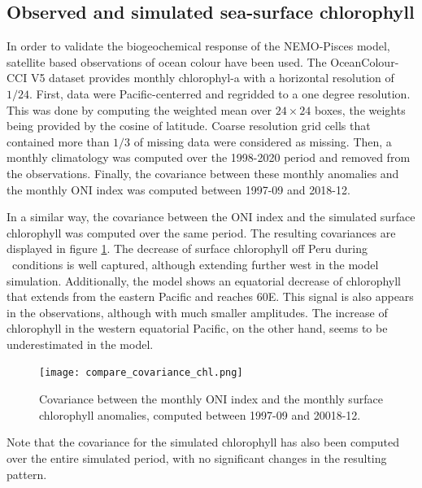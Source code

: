 \subsection{Observed and simulated sea-surface chlorophyll}

In order to validate the biogeochemical response of the NEMO-Pisces model, satellite based observations of ocean colour \citep{sathyendranathOceanColourTimeSeries2019} have been used. The OceanColour-CCI V5 dataset provides monthly chlorophyl-a with a horizontal resolution of $1/24$\degree . First, data were Pacific-centerred and regridded to a one degree resolution. This was done by computing the weighted mean over $24 \times 24$ boxes, the weights being provided by the cosine of latitude. Coarse resolution grid cells that contained more than $1/3$ of missing data were considered as missing. Then, a monthly climatology was computed over the 1998-2020 period and removed from the observations. Finally, the covariance between these monthly anomalies and the monthly ONI index was computed between 1997-09 and 2018-12.

In a similar way, the covariance between the ONI index and the simulated surface chlorophyll was computed over the same period. The resulting covariances are displayed in figure
\ref{fig:chl-cov}. The decrease of surface chlorophyll off Peru during \nino\ conditions is well captured, although extending further west in the model simulation. Additionally, the model shows an equatorial decrease of chlorophyll that extends from the eastern Pacific and reaches $60$\degree E. This signal is also appears in the observations, although with much smaller amplitudes. The increase of chlorophyll in the western equatorial Pacific, on the other hand, seems to be underestimated in the model.

\begin{figure}[h!]
	\centering
	\texttt{[image: compare\_covariance\_chl.png]}
	\caption{Covariance between the monthly ONI index and the monthly surface chlorophyll anomalies, computed between 1997-09 and 20018-12.}
	\label{fig:chl-cov}
\end{figure}

Note that the covariance for the simulated chlorophyll has also been computed over the entire simulated period, with no significant changes in the resulting pattern.

